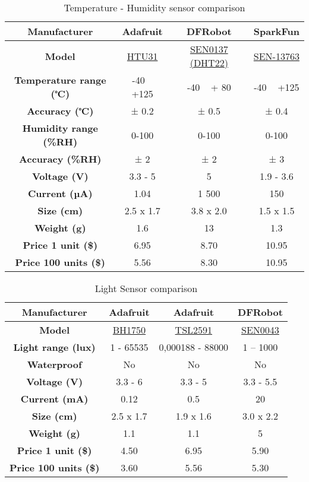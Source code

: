\begin{table}[!h]
    \centering
    \scriptsize
    \begin{tabular}{c c c c}
        \hline
        \textbf{Manufacturer} & Adafruit & DFRobot & SparkFun\\
        \hline
        \textbf{Model} & \href{https://www.adafruit.com/product/4832}{HTU31} & \href{https://www.dfrobot.com/product-1102.html}{SEN0137 (DHT22)} & \href{https://www.sparkfun.com/products/13763#reviews}{SEN-13763}\\
        \textbf{Temperature range (℃)} & -40 ~ +125 & -40 ~ + 80 & -40 ~ +125\\
        \textbf{Accuracy (℃)} & ± 0.2 & ± 0.5 & ± 0.4\\
        \textbf{Humidity range (\%RH)} & 0-100 & 0-100 & 0-100\\
        \textbf{Accuracy (\%RH)} & ± 2 & ± 2 & ± 3\\
        \textbf{Voltage (V)} & 3.3 - 5 & 5 & 1.9 - 3.6\\
        \textbf{Current (µA)} & 1.04 & 1 500 & 150\\
        \textbf{Size (cm)} & 2.5 x 1.7 & 3.8 x 2.0 & 1.5 x 1.5\\
        \textbf{Weight (g)} & 1.6 & 13 & 1.3\\
        \textbf{Price 1 unit (\$)} & 6.95 & 8.70 & 10.95\\
        \textbf{Price 100 units (\$)} & 5.56 & 8.30 & 10.95\\
        \hline
        \end{tabular}
    \caption{Temperature - Humidity sensor comparison}
    \label{tab:temp_hum_sensor_comparison}
\end{table}

\begin{table}[!h]
    \centering
    \begin{tabular}{c c c c}
        \hline
        \textbf{Manufacturer} & Adafruit & Adafruit & DFRobot\\
        \hline
        \textbf{Model} & \href{https://www.adafruit.com/product/4681}{BH1750} & \href{https://learn.adafruit.com/tsl2561}{TSL2591} & \href{https://www.dfrobot.com/product-274.html}{SEN0043}\\
        \textbf{Light range (lux)} & 1 - 65535 & 0,000188 - 88000 & 1 – 1000\\
        \textbf{Waterproof} & No & No & No\\
        \textbf{Voltage (V)} & 3.3 - 6 & 3.3 - 5 & 3.3 - 5.5\\
        \textbf{Current (mA)} & 0.12 & 0.5 & 20\\
        \textbf{Size (cm)} & 2.5 x 1.7 & 1.9 x 1.6 & 3.0 x 2.2\\
        \textbf{Weight (g)} & 1.1 & 1.1 & 5\\
        \textbf{Price 1 unit (\$)} & 4.50 & 6.95 & 5.90\\
        \textbf{Price 100 units (\$)} & 3.60 & 5.56 & 5.30\\
        \hline
        \end{tabular}
    \caption{Light Sensor comparison}
    \label{tab:light_sensor_comparison}
\end{table}

